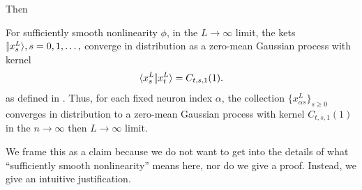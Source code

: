 \documentclass{article}
\theoremstyle{plain}
\theoremstyle{definition}
\begin{document}
Then 
\begin{claim}\label{claim:nonlineardepthmuplimit}
    For sufficiently smooth nonlinearity $\phi$, in the $L \to \infty$ limit, the kets $\ket{x^L_s}, s = 0, 1, \ldots,$ converge in distribution as a zero-mean Gaussian process with kernel
    \[\braket{x^L_s}{x^L_t} = C_{t,s,1}(1).\]
    as defined in .
    Thus, for each fixed neuron index $\alpha$, the collection $\{x^L_{\alpha s}\}_{s\ge 0}$ converges in distribution to a zero-mean Gaussian process with kernel $C_{t,s,1}(1)$ in the $n\to\infty$ then $L\to\infty$ limit.
\end{claim}
We frame this as a claim because we do not want to get into the details of what ``sufficiently smooth nonlinearity'' means here, nor do we give a proof. Instead, we give an intuitive justification.
\end{document}
